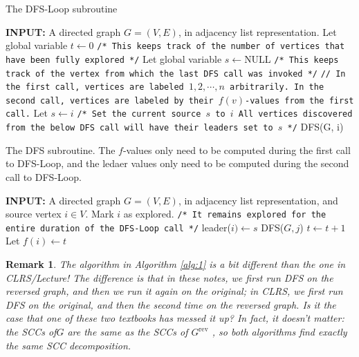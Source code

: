 \documentclass [12pt]{article}
\newtheorem{remark}{Remark}
\theoremstyle{definition}
\begin{document}
\begin{algorithm}
\caption{The DFS-Loop subroutine}
\label{alg:2}
\begin{algorithmic}
\STATE \textbf{INPUT:} A directed graph $G = (V,E)$, in adjacency list representation.
\STATE Let global variable $t \gets 0$ \texttt{/* This keeps track of the number of vertices that have been fully explored */}
\STATE Let global variable $s \gets $NULL \texttt{/* This keeps track of the vertex from which the last DFS call was invoked */}
    \STATE \texttt{// In the first call, vertices are labeled $1, 2, \cdots, n$ arbitrarily. In the second call, vertices are labeled by their $f(v)$-values from the first call.}
        \STATE Let $s \gets i$ \texttt{/* Set the current source $s$ to $i$ All vertices discovered from the below DFS call will have their leaders set to $s$ */}
        \STATE DFS(G, i)
    \ENDIF
\ENDFOR
\end{algorithmic}
\end{algorithm}


\begin{algorithm}
\caption{The DFS subroutine. The $f$-values only need to be computed during the first call to DFS-Loop, and the ledaer values only need to be computed during the second call to DFS-Loop.}
\label{alg:3}
\begin{algorithmic}
\STATE \textbf{INPUT:} A directed graph $G = (V,E)$, in adjacency list representation, and source vertex $i \in V$.
\STATE Mark $i$ as explored. \texttt{/* It remains explored for the entire duration of the DFS-Loop call */}
\STATE leader($i) \gets s$
        \STATE DFS($G,j$)
    \ENDIF
\ENDFOR
\STATE $t \gets t + 1$
\STATE Let $f(i) \gets t$
\end{algorithmic}
\end{algorithm}

\begin{remark} 
The algorithm in Algorithm \ref{alg:1} is a bit different than the one in CLRS/Lecture! The difference is that in these notes, we first run DFS on the reversed graph, and then we run it again on the original; in CLRS, we first run DFS on the original, and then the second time on the reversed graph. Is it the case that one of these two textbooks has messed it up? In fact, it doesn't matter: the SCCs of$G$ are the same as the SCCs of $G^{\text{rev}}$ , so both algorithms find exactly the same SCC decomposition.
\end{remark} 
\end{document}

